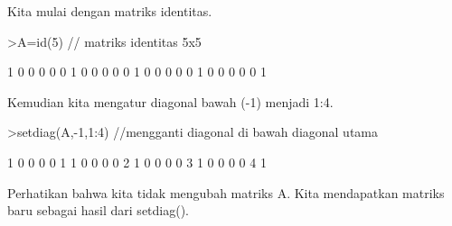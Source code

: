 \documentclass[a4paper,10pt]{article}
\begin{document}
\begin{eulernotebook}
\begin{eulercomment}
\begin{eulercomment}
\begin{eulercomment}
\begin{eulercomment}
\begin{eulercomment}
Kita mulai dengan matriks identitas.
\end{eulercomment}
\begin{eulerprompt}
>A=id(5) // matriks identitas 5x5
\end{eulerprompt}
\begin{euleroutput}
              1             0             0             0             0 
              0             1             0             0             0 
              0             0             1             0             0 
              0             0             0             1             0 
              0             0             0             0             1 
\end{euleroutput}
\begin{eulercomment}
Kemudian kita mengatur diagonal bawah (-1) menjadi 1:4.
\end{eulercomment}
\begin{eulerprompt}
>setdiag(A,-1,1:4) //mengganti diagonal di bawah diagonal utama
\end{eulerprompt}
\begin{euleroutput}
              1             0             0             0             0 
              1             1             0             0             0 
              0             2             1             0             0 
              0             0             3             1             0 
              0             0             0             4             1 
\end{euleroutput}
\begin{eulercomment}
Perhatikan bahwa kita tidak mengubah matriks A. Kita mendapatkan
matriks baru sebagai hasil dari setdiag().


\end{eulercomment}
\end{eulercomment}
\end{eulercomment}
\end{eulercomment}
\end{eulercomment}
\end{eulernotebook}
\end{document}
